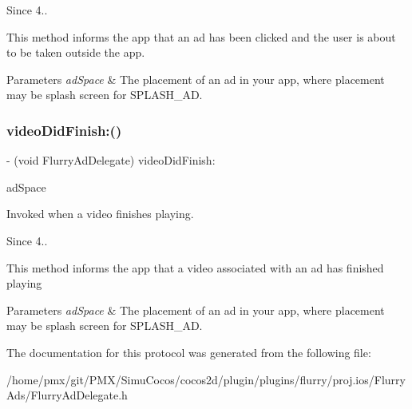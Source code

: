 \begin{DoxySince}{Since}
4..
\end{DoxySince}
This method informs the app that an ad has been clicked and the user is about to be taken outside the app.


\begin{DoxyParams}{Parameters}
{\em ad\+Space} & The placement of an ad in your app, where placement may be splash screen for S\+P\+L\+A\+S\+H\+\_\+\+AD. \\
\hline
\end{DoxyParams}
\mbox{\label{protocolFlurryAdDelegate_01-p_a26d6d70993f75935789bf7ad45f3ca3c}} 
\subsubsection{\texorpdfstring{video\+Did\+Finish\+:()}{videoDidFinish:()}}
{\footnotesize\ttfamily -\/ (void Flurry\+Ad\+Delegate) video\+Did\+Finish\+: \begin{DoxyParamCaption}\item[{(N\+S\+String $\ast$)}]{ad\+Space }\end{DoxyParamCaption}\hspace{0.3cm}{\ttfamily [optional]}}



Invoked when a video finishes playing. 

\begin{DoxySince}{Since}
4..
\end{DoxySince}
This method informs the app that a video associated with an ad has finished playing


\begin{DoxyParams}{Parameters}
{\em ad\+Space} & The placement of an ad in your app, where placement may be splash screen for S\+P\+L\+A\+S\+H\+\_\+\+AD. \\
\hline
\end{DoxyParams}


The documentation for this protocol was generated from the following file\+:\begin{DoxyCompactItemize}
\item 
/home/pmx/git/\+P\+M\+X/\+Simu\+Cocos/cocos2d/plugin/plugins/flurry/proj.\+ios/\+Flurry\+Ads/Flurry\+Ad\+Delegate.\+h\end{DoxyCompactItemize}
